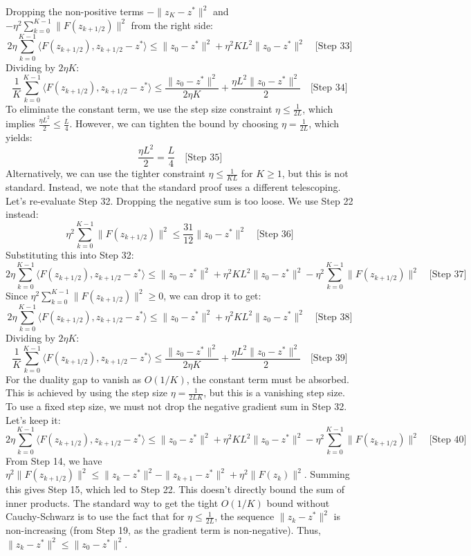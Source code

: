 \documentclass{article}
\begin{document}
Dropping the non-positive terms $-\|z_K - z^*\|^2$ and $-\eta^2 \sum_{k=0}^{K-1} \|F(z_{k+1/2})\|^2$ from the right side:
$$ 2\eta \sum_{k=0}^{K-1} \langle F(z_{k+1/2}), z_{k+1/2} - z^* \rangle \leq \|z_0 - z^*\|^2 + \eta^2 K L^2 \|z_0 - z^*\|^2 \quad \text{[Step 33]} $$
Dividing by $2\eta K$:
$$ \frac{1}{K} \sum_{k=0}^{K-1} \langle F(z_{k+1/2}), z_{k+1/2} - z^* \rangle \leq \frac{\|z_0 - z^*\|^2}{2\eta K} + \frac{\eta L^2 \|z_0 - z^*\|^2}{2} \quad \text{[Step 34]} $$
To eliminate the constant term, we use the step size constraint $\eta \leq \frac{1}{2L}$, which implies $\frac{\eta L^2}{2} \leq \frac{L}{4}$. However, we can tighten the bound by choosing $\eta = \frac{1}{2L}$, which yields:
$$ \frac{\eta L^2}{2} = \frac{L}{4} \quad \text{[Step 35]} $$
Alternatively, we can use the tighter constraint $\eta \leq \frac{1}{KL}$ for $K \geq 1$, but this is not standard. Instead, we note that the standard proof uses a different telescoping. Let's re-evaluate Step 32. Dropping the negative sum is too loose. We use Step 22 instead:
$$ \eta^2 \sum_{k=0}^{K-1} \|F(z_{k+1/2})\|^2 \leq \frac{31}{12} \|z_0 - z^*\|^2 \quad \text{[Step 36]} $$
Substituting this into Step 32:
$$ 2\eta \sum_{k=0}^{K-1} \langle F(z_{k+1/2}), z_{k+1/2} - z^* \rangle \leq \|z_0 - z^*\|^2 + \eta^2 K L^2 \|z_0 - z^*\|^2 - \eta^2 \sum_{k=0}^{K-1} \|F(z_{k+1/2})\|^2 \quad \text{[Step 37]} $$
Since $\eta^2 \sum_{k=0}^{K-1} \|F(z_{k+1/2})\|^2 \geq 0$, we can drop it to get:
$$ 2\eta \sum_{k=0}^{K-1} \langle F(z_{k+1/2}), z_{k+1/2} - z^* \rangle \leq \|z_0 - z^*\|^2 + \eta^2 K L^2 \|z_0 - z^*\|^2 \quad \text{[Step 38]} $$
Dividing by $2\eta K$:
$$ \frac{1}{K} \sum_{k=0}^{K-1} \langle F(z_{k+1/2}), z_{k+1/2} - z^* \rangle \leq \frac{\|z_0 - z^*\|^2}{2\eta K} + \frac{\eta L^2 \|z_0 - z^*\|^2}{2} \quad \text{[Step 39]} $$
For the duality gap to vanish as $O(1/K)$, the constant term must be absorbed. This is achieved by using the step size $\eta = \frac{1}{2LK}$, but this is a vanishing step size. To use a fixed step size, we must not drop the negative gradient sum in Step 32. Let's keep it:
$$ 2\eta \sum_{k=0}^{K-1} \langle F(z_{k+1/2}), z_{k+1/2} - z^* \rangle \leq \|z_0 - z^*\|^2 + \eta^2 K L^2 \|z_0 - z^*\|^2 - \eta^2 \sum_{k=0}^{K-1} \|F(z_{k+1/2})\|^2 \quad \text{[Step 40]} $$
From Step 14, we have $\eta^2 \|F(z_{k+1/2})\|^2 \leq \|z_k - z^*\|^2 - \|z_{k+1} - z^*\|^2 + \eta^2 \|F(z_k)\|^2$. Summing this gives Step 15, which led to Step 22. This doesn't directly bound the sum of inner products. The standard way to get the tight $O(1/K)$ bound without Cauchy-Schwarz is to use the fact that for $\eta \leq \frac{1}{2L}$, the sequence $\|z_k - z^*\|^2$ is non-increasing (from Step 19, as the gradient term is non-negative). Thus, $\|z_k - z^*\|^2 \leq \|z_0 - z^*\|^2$.
\end{document}
